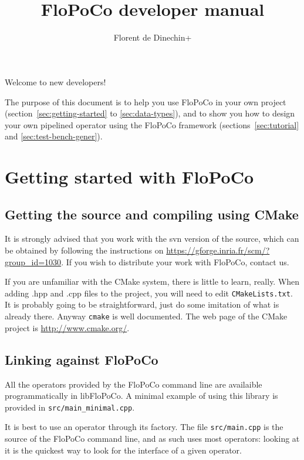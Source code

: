 \documentclass{article}
\title{\scalebox{0.3}{\mbox{}}\\
FloPoCo  developer manual
}
\author{Florent de Dinechin+}
\begin{document}
 
\sloppy



\maketitle


Welcome to new developers! 

The purpose of this document is to help you use FloPoCo in your own
project (section~\ref{sec:getting-started} to \ref{sec:data-types}), and to show you how to design your own pipelined operator
using the FloPoCo framework (sections~\ref{sec:tutorial} and \ref{sec:test-bench-gener}). 

\tableofcontents

\section{Getting started with FloPoCo\label{sec:getting-started}}


\subsection{Getting the source and compiling using CMake}

It is strongly advised that you work with the svn version of the
source, which can be obtained by following the instructions on
\url{https://gforge.inria.fr/scm/?group_id=1030}. If you wish to
distribute your work with FloPoCo,  contact us.

If you are unfamiliar with the CMake system, there is little to learn,
really. When adding .hpp and .cpp files to the project, you will need
to edit \texttt{CMakeLists.txt}. It is probably going to be straightforward,
just do some imitation of what is already there. Anyway \texttt{cmake} is well
documented. The web page of the CMake project is \url{http://www.cmake.org/}.

\subsection{Linking against FloPoCo\label{sec:linking}}
All the operators provided by the FloPoCo command line are availaible
programmatically in libFloPoCo. A minimal example of using this
library is provided in \texttt{src/main\_minimal.cpp}.

It is best to use an operator through its factory. The file \texttt{src/main.cpp} is the source of the FloPoCo command
line, and as such uses most operators: looking at it is the quickest
way to look for the interface of a given operator.
\end{document}
